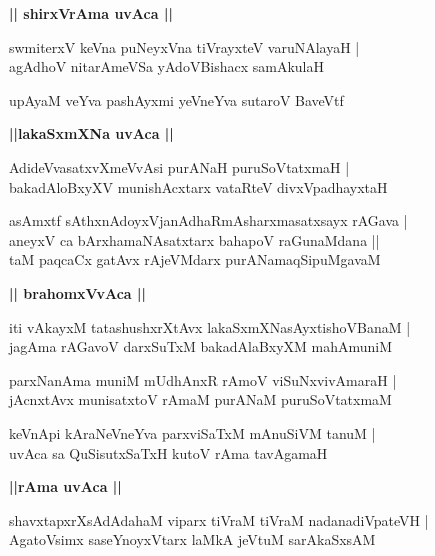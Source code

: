 \documentclass[twoside,12pt,openright]{book}
\newcounter{shloka}[chapter]
\def\uvaca#1{\centerline{{\large\textbf{#1}}}}
\begin{document}
\uvaca{|| shirxVrAma uvAca ||}

\begin{shloka}%
swmiterxV keVna puNeyxVna tiVrayxteV varuNAlayaH |\\
agAdhoV nitarAmeVSa yAdoVBishacx samAkulaH 
\end{shloka}

\begin{shloka}%
upAyaM veYva pashAyxmi yeVneYva sutaroV BaveVtf
\end{shloka}

\uvaca{||lakaSxmXNa uvAca ||}

\begin{shloka}%
AdideVvasatxvXmeVvAsi purANaH puruSoVtatxmaH |\\
bakadAloBxyXV munishAcxtarx vataRteV divxVpadhayxtaH 
\end{shloka}

\begin{shloka}%
asAmxtf sAthxnAdoyxVjanAdhaRmAsharxmasatxsayx rAGava |\\
aneyxV ca bArxhamaNAsatxtarx bahapoV raGunaMdana ||\\
taM paqcaCx gatAvx rAjeVMdarx purANamaqSipuMgavaM 
\end{shloka}

\uvaca{|| brahomxVvAca ||}

\begin{shloka}%
iti vAkayxM tatashushxrXtAvx lakaSxmXNasAyxtishoVBanaM |\\
jagAma rAGavoV darxSuTxM bakadAlaBxyXM mahAmuniM 
\end{shloka}

\begin{shloka}%
parxNanAma muniM mUdhAnxR rAmoV viSuNxvivAmaraH |\\
jAcnxtAvx munisatxtoV rAmaM purANaM puruSoVtatxmaM 
\end{shloka}

\begin{shloka}%
keVnApi kAraNeVneYva parxviSaTxM mAnuSiVM tanuM |\\
uvAca sa QuSisutxSaTxH kutoV rAma tavAgamaH 
\end{shloka}

\uvaca{||rAma uvAca ||}

\begin{shloka}%
shavxtapxrXsAdAdahaM viparx tiVraM tiVraM nadanadiVpateVH |\\
AgatoVsimx saseYnoyxVtarx laMkA jeVtuM sarAkaSxsAM 
\end{shloka}
\end{document}
